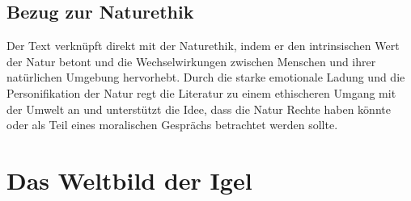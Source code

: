 \documentclass{article}
\begin{document}
\subsection*{Bezug zur Naturethik}
Der Text verknüpft direkt mit der Naturethik, indem er den intrinsischen Wert der Natur betont und die Wechselwirkungen zwischen Menschen und ihrer natürlichen Umgebung hervorhebt. Durch die starke emotionale Ladung und die Personifikation der Natur regt die Literatur zu einem ethischeren Umgang mit der Umwelt an und unterstützt die Idee, dass die Natur Rechte haben könnte oder als Teil eines moralischen Gesprächs betrachtet werden sollte.

\newpage
\section{Das Weltbild der Igel}
\end{document}
